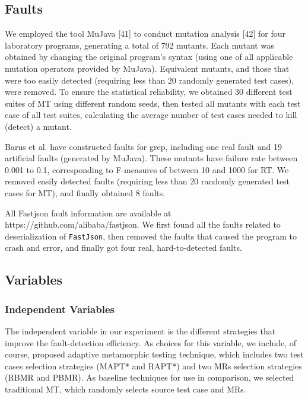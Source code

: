\documentclass[10pt,journal,compsoc]{IEEEtran}
\begin{document}
\subsection{Faults}
\label{sec:faults}

We employed the tool MuJava [41] to conduct mutation analysis [42] for four laboratory programs, generating a total of 792 mutants. Each mutant was obtained by changing the original program’s syntax (using one of all applicable mutation operators provided by MuJava). Equivalent mutants, and those that were too easily detected (requiring less than 20 randomly generated test cases), were removed. To ensure the statistical reliability, we obtained 30 different test suites of MT using different random seeds, then tested all mutants with each test case of all test suites, calculating the average number of test cases needed to kill (detect) a mutant.

Barus et al. \cite{barus2014novel} have constructed faults for grep, including one real fault and 19 artificial faults (generated by MuJava). These mutants have failure rate between 0.001 to 0.1, corresponding to F-measures of between 10 and 1000 for RT.
We removed easily detected faults (requiring less than 20 randomly generated test cases for MT), and finally obtained 8 faults.

All Fastjson fault information are available at https://github.com/alibaba/fastjson. We first found all the faults related to deserialization of \texttt{FastJson}, then removed the faults that caused the program to crash and error, and finally got four real, hard-to-detected faults.


\subsection{Variables}
\label{sec:variable}
\subsubsection{Independent Variables}
\label{sec:independentvariables}

The independent variable in our experiment is the different strategies that improve the fault-detection efficiency. As choices for this variable, we include, of course, proposed adaptive metamorphic testing technique, which includes two test cases selection strategies (MAPT* and RAPT*) and two MRs selection strategies (RBMR and PBMR). As baseline techniques for use in comparison, we selected traditional MT, which randomly selects source test case and MRs.
\end{document}

